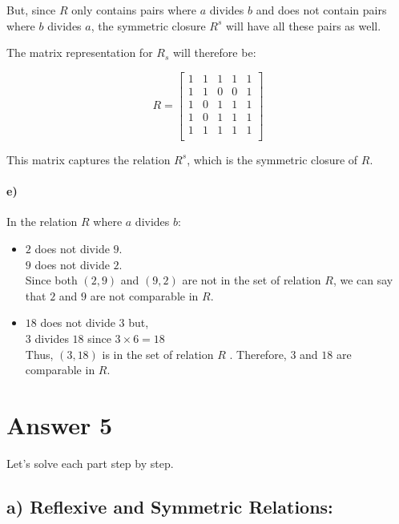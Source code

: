 \documentclass[12pt]{article}
\begin{document}
But, since \( R \) only contains pairs where \( a \) divides \( b \) and does not contain pairs where \( b \) divides \( a \), the symmetric closure \( R^s \) will have all these pairs as well.

The matrix representation for \( R_s \) will therefore be:

\[
R = \begin{bmatrix}
1 & 1 & 1 & 1 & 1 \\
1 & 1 & 0 & 0 & 1 \\
1 & 0 & 1 & 1 & 1 \\
1 & 0 & 1 & 1 & 1 \\
1 & 1 & 1 & 1 & 1 \\
\end{bmatrix}
\]

This matrix captures the relation \( R^s \), which is the symmetric closure of \( R \).

\paragraph{e)}


In the relation \( R \) where \( a \) divides \( b \):

\begin{itemize}
    \item \( 2 \) does not divide \( 9 \). \\
    \( 9 \) does not divide \( 2 \). \\
    Since both \( (2,9) \) and \( (9,2) \) are not in the set of relation \( R \), we can say that \( 2 \) and \( 9 \) are not comparable in \( R \).
    \item \( 18 \) does not divide \( 3 \) but,\\
    \( 3 \) divides \( 18 \) since \( 3 \times 6 = 18 \)\\
    Thus, \( (3,18) \) is in the set of relation \( R \) . Therefore, \( 3 \) and \( 18 \) are comparable in \( R \).
\end{itemize}


\section*{Answer 5}


Let's solve each part step by step.

\subsection*{a) Reflexive and Symmetric Relations:}
\end{document}
